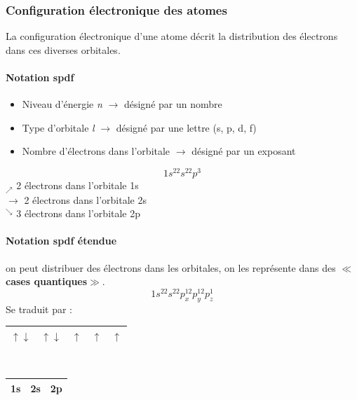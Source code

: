 \documentclass[10pt,a4paper]{book}
\begin{document}
\subsubsection{Configuration électronique des atomes}
La configuration électronique d'une atome décrit la distribution des électrons dans ces diverses orbitales.
\paragraph{Notation spdf}
\begin{itemize}
\item Niveau d'énergie \textit{n} $\rightarrow$ désigné par un nombre
\item Type d'orbitale \textit{l} $\rightarrow$ désigné par une lettre (s, p, d, f)
\item Nombre d'électrons dans l'orbitale $\rightarrow$ désigné par un exposant
\end{itemize}
\begin{displaymath}
1s^22s^22p^3
\end{displaymath}
$_\nearrow$ 2 électrons dans l'orbitale 1s \\
$\rightarrow$ 2 électrons dans l'orbitale 2s \\
$^\searrow$ 3 électrons dans l'orbitale 2p 
\paragraph{Notation spdf étendue} on peut distribuer des électrons dans les orbitales, on les représente dans des $\ll$\textbf{cases quantiques}$\gg$.
\begin{displaymath}
1s^22s^22p_x^12p_y^12p_z^1
\end{displaymath}
Se traduit par :
\begin{center}
\begin{tabular}{| c | c | c | c | c |}
\hline
$\uparrow\downarrow$ & $\uparrow\downarrow$ & $\uparrow$ & $\uparrow$  & $\uparrow$ \\
\hline
\end{tabular} \\
\begin{tabular}{| c | c | m{1.5cm}|}
\hline
1s & 2s & 2p \\
\hline
\end{tabular}
\end{center}
\end{document}
